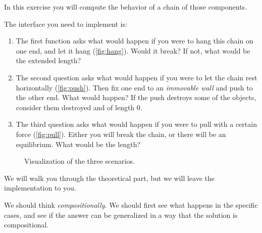 \begin{gradedexercise}
  In this exercise you will compute the behavior of a chain of those components.

  The interface you need to implement is:



  \begin{enumerate}
    \item The first function asks what would happen if you were to hang this chain on one end, and let it hang (\cref{fig:hang}).
    Would it break? If not, what would be the extended length?
    \item The second question asks what would happen if you were to let the chain rest horizontally (\cref{fig:push}). Then fix one end to an \emph{immovable wall} and push to the other end. What would happen? If the push destroys some of the objects, consider
    them destroyed and of length 0.
    \item  The third question asks what would happen if you were to pull with a certain force  (\cref{fig:pull}). Either you will break the chain, or there will be an equilibrium. What would be the length?
  \end{enumerate}

\end{gradedexercise}

\begin{figure}
  \hfill
  \hfill
  \hfill
  \hfill
  \caption{Visualization of the three scenarios.
  }
\end{figure}


We will walk you through the theoretical part, but we will leave the implementation to you.

We should think \emph{compositionally}. We should first see what happens in the specific cases,
and see if the answer can be generalized in a way that the solution is compositional.




